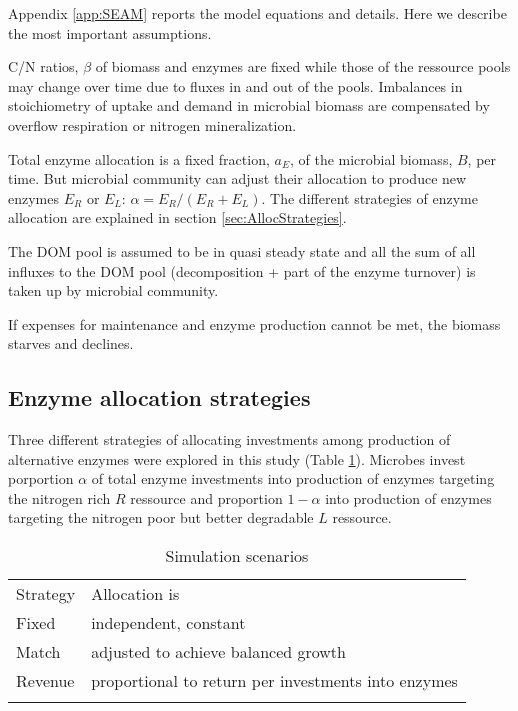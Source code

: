 Appendix \ref{app:SEAM} reports the model equations and details. Here we
describe the most important assumptions.

C/N ratios, $\beta$ of biomass and enzymes are
fixed while those of the ressource pools may change over time due to
fluxes in and out of the pools. Imbalances in stoichiometry of uptake and demand
in microbial biomass are compensated by overflow respiration or nitrogen
mineralization.

Total enzyme allocation is a fixed fraction, $a_E$, of the microbial biomass,
$B$, per time. But microbial community can adjust their allocation to produce
new enzymes $E_R$ or $E_L$: $\alpha = E_R / (E_R + E_L)$. The different
strategies of enzyme allocation are explained in section
\ref{sec:AllocStrategies}.

The DOM pool is assumed to be in quasi steady state and all the sum of all
influxes to the DOM pool (decomposition + part of the enzyme turnover) is taken
up by microbial community.

If expenses for maintenance and enzyme production cannot be met, the biomass
starves and declines.
 
\subsection{ Enzyme allocation strategies 
\label{sec:AllocStrategies}}

Three different strategies of allocating investments among production of
alternative enzymes were explored in this study (Table
\ref{tab:AllocStrategies}). Microbes invest porportion $\alpha$ of total enzyme
investments into production of enzymes targeting the nitrogen rich $R$ ressource
and proportion $1 - \alpha$ into production of enzymes targeting the nitrogen
poor but better degradable $L$ ressource.

\begin{table}[t]
\caption{Simulation scenarios \label{tab:AllocStrategies}}
\vskip4mm
\centering
\begin{tabular}{ll}
\tophline
Strategy &  Allocation is \\
\middlehline
Fixed & independent, constant \\
Match & adjusted to achieve balanced growth \\
Revenue & proportional to return per investments into enzymes \\
\bottomhline
\end{tabular}
\end{table}



